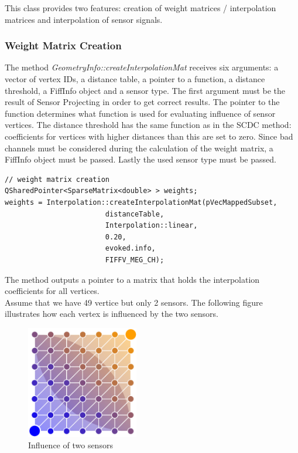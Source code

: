 This class provides two features: creation of weight matrices / interpolation matrices and interpolation of sensor signals.

\subsubsection{Weight Matrix Creation}

The method \textit{GeometryInfo::createInterpolationMat} receives six arguments: a vector of vertex IDs, a distance table, a pointer to a function, a distance threshold, a FiffInfo object and a sensor type. The first argument must be the result of Sensor Projecting in order to get correct results. The pointer to the function determines what function is used for evaluating influence of sensor vertices. The distance threshold has the same function as in the SCDC method: coefficients for vertices with higher distances than this are set to zero. Since bad channels must be considered during the calculation of the weight matrix, a FiffInfo object must be passed. Lastly the used sensor type must be passed. 

\begin{lstlisting}
// weight matrix creation
QSharedPointer<SparseMatrix<double> > weights;
weights = Interpolation::createInterpolationMat(pVecMappedSubset,
						distanceTable,
						Interpolation::linear,
						0.20,
						evoked.info,
						FIFFV_MEG_CH);
\end{lstlisting}

The method outputs a pointer to a matrix that holds the interpolation coefficients for all vertices.\\
Assume that we have 49 vertice but only 2 sensors. The following figure illustrates how each vertex is influenced by the two sensors.

\begin{figure}[h]
	\begin{center}
		\includegraphics[width=4.9cm]{figures/coefficients.png}
		\caption{Influence of two sensors}
	\end{center}
\end{figure}

